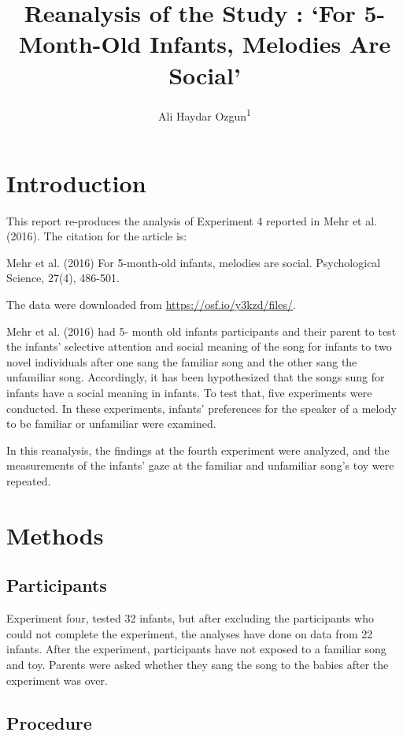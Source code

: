 \documentclass[
  english,
  man]{apa6}
\title{Reanalysis of the Study : `For 5-Month-Old Infants, Melodies Are Social'}
\author{Ali Haydar Ozgun\textsuperscript{1}}
\date{}
\affiliation{\vspace{0.5cm}\textsuperscript{1} CUNY - Brooklyn College}
\begin{document}
\maketitle

\hypertarget{introduction}{%
\section{Introduction}\label{introduction}}

This report re-produces the analysis of Experiment 4 reported in Mehr et al. (2016). The citation for the article is:

Mehr et al. (2016) For 5-month-old infants, melodies are social. Psychological Science, 27(4), 486-501.

The data were downloaded from \url{https://osf.io/y3kzd/files/}.

Mehr et al. (2016) had 5- month old infants participants and their parent to test the infants' selective attention and social meaning of the song for infants to two novel individuals after one sang the familiar song and the other sang the unfamiliar song. Accordingly, it has been hypothesized that the songs sung for infants have a social meaning in infants. To test that, five experiments were conducted. In these experiments, infants' preferences for the speaker of a melody to be familiar or unfamiliar were examined.

In this reanalysis, the findings at the fourth experiment were analyzed, and the measurements of the infants' gaze at the familiar and unfamiliar song's toy were repeated.

\hypertarget{methods}{%
\section{Methods}\label{methods}}

\hypertarget{participants}{%
\subsection{Participants}\label{participants}}

Experiment four, tested 32 infants, but after excluding the participants who could not complete the experiment, the analyses have done on data from 22 infants. After the experiment, participants have not exposed to a familiar song and toy. Parents were asked whether they sang the song to the babies after the experiment was over.

\hypertarget{procedure}{%
\subsection{Procedure}\label{procedure}}
\end{document}
